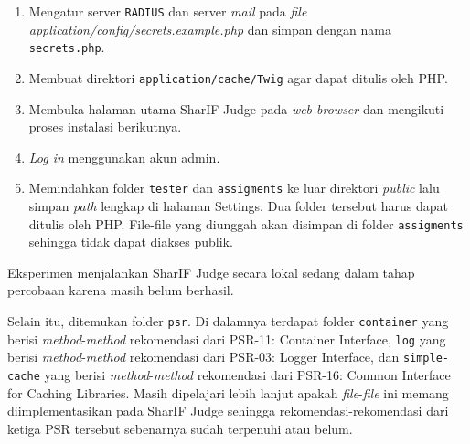 \documentclass[a4paper,twoside]{article}
\begin{document}
\begin{enumerate}
\begin{enumerate}
			 \item Mengatur server \verb|RADIUS| dan server \textit{mail} pada \textit{file application/config/secrets.example.php} dan simpan dengan nama \verb|secrets.php|.
			 \item Membuat direktori \verb|application/cache/Twig| agar dapat ditulis oleh PHP.
			 \item Membuka halaman utama SharIF Judge pada \textit{web browser} dan mengikuti proses instalasi berikutnya.
			 \item \textit{Log in} menggunakan akun admin.
			 \item Memindahkan folder \verb|tester| dan \verb|assigments| ke luar direktori \textit{public} lalu simpan \textit{path} lengkap di halaman Settings. Dua folder tersebut harus dapat ditulis oleh PHP. File-file yang diunggah
			 akan disimpan di folder \verb|assigments| sehingga tidak dapat diakses publik.
		\end{enumerate}
		
		 Eksperimen menjalankan SharIF Judge secara lokal sedang dalam tahap percobaan karena masih belum berhasil.
		 
		 Selain itu, ditemukan folder \verb|psr|. Di dalamnya terdapat folder \verb|container| yang berisi \textit{method}-\textit{method} rekomendasi dari PSR-11: Container Interface, \verb|log| yang berisi \textit{method}-\textit{method} rekomendasi dari PSR-03: Logger Interface, dan \verb|simple-cache| yang berisi \textit{method}-\textit{method} rekomendasi dari PSR-16: Common Interface for Caching Libraries. Masih dipelajari lebih lanjut apakah \textit{file}-\textit{file} ini memang diimplementasikan pada SharIF Judge sehingga rekomendasi-rekomendasi dari ketiga PSR tersebut sebenarnya sudah terpenuhi atau belum.  
		

\end{enumerate}
\end{document}
